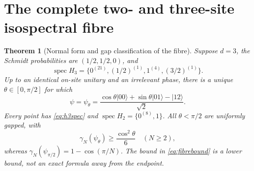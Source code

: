\documentclass[11pt,a4paper]{article}
\newtheorem{theorem}{Theorem}[section]
\theoremstyle{remark}\newtheorem{remark}[theorem]{Remark}
\newcommand{\ket}[1]{\lvert #1\rangle}
\newcommand{\spec}{\operatorname{spec}}
\begin{document}
\section{The complete two- and three-site isospectral fibre}\label{sec:isospectral}
\begin{theorem}[Normal form and gap classification of the fibre]\label{thm:fibre}
Suppose $d=3$, the Schmidt probabilities are $(1/2,1/2,0)$, and
\begin{equation}\label{eq:h3spec}
 \spec H_3=\{0^{(21)},(1/2)^{(1)},1^{(4)},(3/2)^{(1)}\}.
\end{equation}
Up to an identical on-site unitary and an irrelevant phase, there is a unique $\theta\in[0,\pi/2]$ for which
\begin{equation}\label{eq:isopath}
 \psi=\psi_\theta=
 \frac{\cos\theta\ket{00}+\sin\theta\ket{01}-\ket{12}}{\sqrt2}.
\end{equation}
Every point has \eqref{eq:h3spec} and $\spec H_2=\{0^{(8)},1\}$. All $\theta<\pi/2$ are uniformly gapped, with
\begin{equation}\label{eq:fibrebound}
 \gamma_N(\psi_\theta)\ge\frac{\cos^2\theta}{6}\quad(N\ge2),
\end{equation}
whereas $\gamma_N(\psi_{\pi/2})=1-\cos(\pi/N)$. The bound in \eqref{eq:fibrebound} is a lower bound, not an exact formula away from the endpoint.
\end{theorem}
\end{document}
